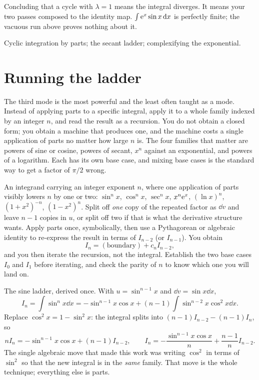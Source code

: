 \begin{trap}
Concluding that a cycle with $\lambda=1$ means the integral diverges. It means your two passes composed to the identity map. $\int\mathrm{e}^{x}\sin x\,\mathrm{d} x$ is perfectly finite; the vacuous run above proves nothing about it.
\end{trap}

\begin{seealsob}Cyclic integration by parts; the secant ladder; complexifying the exponential.\end{seealsob}

\section{Running the ladder}

The third mode is the most powerful and the least often taught as a mode. Instead of applying parts to a specific integral, apply it to a whole family indexed by an integer $n$, and read the result as a recursion. You do not obtain a closed form; you obtain a machine that produces one, and the machine costs a single application of parts no matter how large $n$ is. The four families that matter are powers of sine or cosine, powers of secant, $x^{n}$ against an exponential, and powers of a logarithm. Each has its own base case, and mixing base cases is the standard way to get a factor of $\pi/2$ wrong.

\cue An integrand carrying an integer exponent $n$, where one application of parts visibly lowers $n$ by one or two: $\sin^{n}x$, $\cos^{n}x$, $\sec^{n}x$, $x^{n}\mathrm{e}^{x}$, $(\ln x)^{n}$, $(1+x^{2})^{-n}$, $(1-x^{2})^{n}$.
\method Split off \emph{one} copy of the repeated factor as $\dd v$ and leave $n-1$ copies in $u$, or split off two if that is what the derivative structure wants. Apply parts once, symbolically, then use a Pythagorean or algebraic identity to re-express the result in terms of $I_{n-2}$ (or $I_{n-1}$). You obtain
\[I_n=(\text{boundary})+c_nI_{n-2},\]
and you then iterate the recursion, not the integral. Establish the two base cases $I_0$ and $I_1$ before iterating, and check the parity of $n$ to know which one you will land on.

\begin{worked}
The sine ladder, derived once. With $u=\sin^{n-1}x$ and $\dd v=\sin x\dd x$,
\[I_n=\int\sin^{n}x\dd x=-\sin^{n-1}x\cos x+(n-1)\int\sin^{n-2}x\cos^{2}x\dd x.\]
Replace $\cos^{2}x=1-\sin^{2}x$: the integral splits into $(n-1)I_{n-2}-(n-1)I_n$, so
\[nI_n=-\sin^{n-1}x\cos x+(n-1)I_{n-2},\qquad I_n=-\frac{\sin^{n-1}x\cos x}{n}+\frac{n-1}{n}I_{n-2}.\]
The single algebraic move that made this work was writing $\cos^{2}$ in terms of $\sin^{2}$ so that the new integral is in the \emph{same} family. That move is the whole technique; everything else is parts.
\end{worked}

